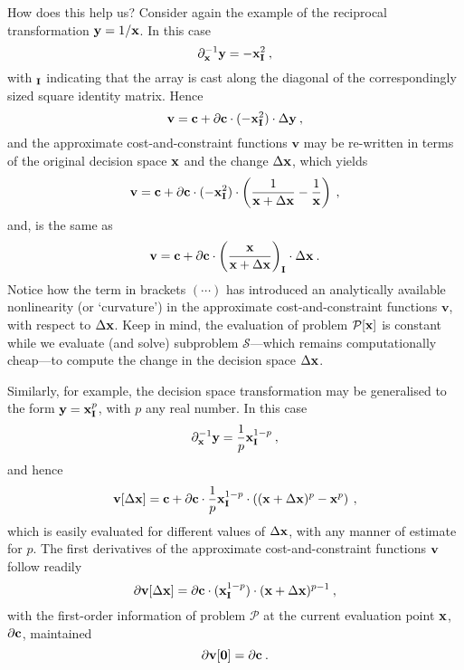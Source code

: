 \documentclass[11pt]{article}
\begin{document}
How does this help us? Consider again the example of the reciprocal transformation $\mathbf{y} = 1/ \mathbf{x}$. In this case
\begin{equation}
\partial_{\mathbf{x}}^{-1} \mathbf{y} = - \mathbf{x}_{\mathbf{I}}^2   \: ,
\end{equation}
with $_{\mathbf{I}}$ indicating that the array is cast along the diagonal of the correspondingly sized square identity matrix. Hence
\begin{equation}
    \textbf{v} = \mathbf{c} + \partial \mathbf{c}  \cdot (-\mathbf{x}_{\mathbf{I}}^2) \cdot \Delta \mathbf{y}  \:,
\end{equation}
and the approximate cost-and-constraint functions $\textbf{v}$ may be re-written in terms of the original decision space $\mathbf{x}$ and the change $\Delta \mathbf{x}$, which yields
\begin{equation}
    \textbf{v} = \mathbf{c} + \partial \mathbf{c} \cdot (-\mathbf{x}_{\mathbf{I}}^2)  \cdot \left( \frac{1}{ \mathbf{x} + \Delta\mathbf{x}} - \frac{1}{\mathbf{x}} \right)   \:,
\end{equation}
and, is the same as
\begin{equation}
    \textbf{v} = \mathbf{c} + \partial \mathbf{c}  \cdot \left( \frac{\mathbf{x}}{\mathbf{x} + \Delta \mathbf{x}} \right)_{\mathbf{I}}\cdot \Delta \mathbf{x}   \:.
\end{equation}
Notice how the term in brackets $(\cdots)$ has introduced an analytically available nonlinearity (or `curvature') in the approximate cost-and-constraint functions $\textbf{v}$, with respect to $\Delta \mathbf{x}$. Keep in mind, the evaluation of problem $\mathcal{P} [\mathbf{x}]$ is constant while we evaluate (and solve) subproblem $\mathcal{S}$---which remains computationally cheap---to compute the change in the decision space $\Delta \mathbf{x}$.

Similarly, for example, the decision space transformation may be generalised to the form $\mathbf{y} = \mathbf{x}_{\mathbf{I}}^p$, with $p$ any real number. In this case
\begin{equation}
\partial_{\mathbf{x}}^{-1} \mathbf{y} = \frac {1}{p} \mathbf{x}_{\mathbf{I}}^{1-p}   \: ,
\end{equation}
and hence
\begin{equation}
    \mathbf{v}[\Delta \mathbf{x}] = \mathbf{c} + \partial \mathbf{c} \cdot \frac {1}{p}  \mathbf{x}_{\mathbf{I}}^{1-p}  \cdot \left( (\mathbf{x} + \Delta\mathbf{x})^p - \mathbf{x}^p \right)   \:,
\end{equation}
which is easily evaluated for different values of $\Delta \mathbf{x}$, with any manner of estimate for $p$. The first derivatives of the approximate cost-and-constraint functions $\mathbf{v}$ follow readily
\begin{equation}
\partial\mathbf{v}[\Delta \mathbf{x}] = \partial \mathbf{c} \cdot (\mathbf{x}_{\mathbf{I}}^{1-p}) \cdot (\mathbf{x} + \Delta \mathbf{x})^{p-1} \:,
\end{equation}
with the first-order information of problem $\mathcal{P}$ at the current evaluation point $\mathbf{x}$, $\partial \mathbf{c}$, maintained
\begin{equation}
\partial\mathbf{v}[ \mathbf{0}] = \partial \mathbf{c} \:.
\end{equation}
\end{document}

